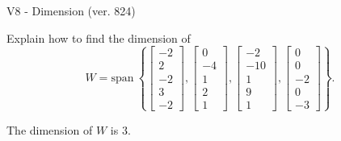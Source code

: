 \begin{exercise}
  \begin{exerciseTitle}V8 - Dimension (ver. 824)\end{exerciseTitle}
  \begin{exerciseStatement}
    Explain how to find the dimension of 
\[W=\mathrm{span}\ \left\{\left[\begin{array}{r}
-2 \\
2 \\
-2 \\
3 \\
-2
\end{array}\right] , \left[\begin{array}{r}
0 \\
-4 \\
1 \\
2 \\
1
\end{array}\right] , \left[\begin{array}{r}
-2 \\
-10 \\
1 \\
9 \\
1
\end{array}\right] , \left[\begin{array}{r}
0 \\
0 \\
-2 \\
0 \\
-3
\end{array}\right]\right\}.\]



  \end{exerciseStatement}
  \begin{exerciseAnswer}
   The dimension of \(W\) is  \(3\).
  


  \end{exerciseAnswer}
\end{exercise}